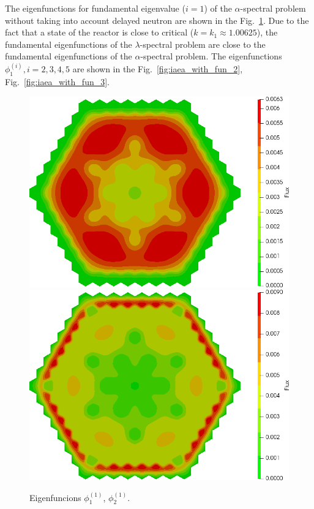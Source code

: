 \documentclass[authoryear]{elsarticle}
\begin{document}
The eigenfunctions for fundamental eigenvalue ($i=1$) of the $\alpha$-spectral problem without taking into account delayed neutron are shown in the Fig.~\ref{fig:iaea_with_fun_1}. 
Due to the fact that a state of the reactor is close to critical ($k=k_1\approx 1.00625$), the fundamental eigenfunctions of the $\lambda$-spectral problem are close to the fundamental eigenfunctions of the $\alpha$-spectral problem.
The eigenfunctions $\phi_1^{(i)}, i=2,3,4,5$ are shown in the Fig.~\ref{fig:iaea_with_fun_2}, Fig.~\ref{fig:iaea_with_fun_3}.

\begin{figure}[H]
\begin{center}
	\includegraphics[width=0.49\linewidth]{iaea_with/alpha_sp3_u1_1.png}
	\includegraphics[width=0.49\linewidth]{iaea_with/alpha_sp3_u2_1.png}\\
	\caption{Eigenfuncions $\phi_1^{(1)}$, $\phi_2^{(1)}$.}
	\label{fig:iaea_with_fun_1}
\end{center}
\end{figure}
\end{document}

